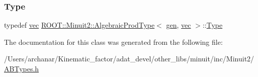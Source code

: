 \mbox{\label{classROOT_1_1Minuit2_1_1AlgebraicProdType_3_01gen_00_01vec_01_4_aea7f5057aa02e4473fef4887b06d4f71}} 
\subsubsection{\texorpdfstring{Type}{Type}\hspace{0.1cm}{\footnotesize\ttfamily [2/2]}}
{\footnotesize\ttfamily typedef \mbox{\hyperlink{classROOT_1_1Minuit2_1_1vec}{vec}} \mbox{\hyperlink{classROOT_1_1Minuit2_1_1AlgebraicProdType}{R\+O\+O\+T\+::\+Minuit2\+::\+Algebraic\+Prod\+Type}}$<$ \mbox{\hyperlink{classROOT_1_1Minuit2_1_1gen}{gen}}, \mbox{\hyperlink{classROOT_1_1Minuit2_1_1vec}{vec}} $>$\+::\mbox{\hyperlink{classROOT_1_1Minuit2_1_1AlgebraicProdType_3_01gen_00_01vec_01_4_aea7f5057aa02e4473fef4887b06d4f71}{Type}}}



The documentation for this class was generated from the following file\+:\begin{DoxyCompactItemize}
\item 
/\+Users/archanar/\+Kinematic\+\_\+factor/adat\+\_\+devel/other\+\_\+libs/minuit/inc/\+Minuit2/\mbox{\hyperlink{other__libs_2minuit_2inc_2Minuit2_2ABTypes_8h}{A\+B\+Types.\+h}}\end{DoxyCompactItemize}

